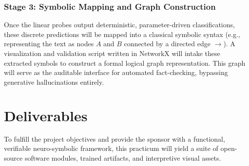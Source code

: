 \documentclass[12 pt]{article}  %
\begin{document}
\subsubsection{Stage 3: Symbolic Mapping and Graph Construction}
Once the linear probes output deterministic, parameter-driven classifications, these discrete predictions will be mapped into a classical symbolic syntax (e.g., representing the text as nodes $A$ and $B$ connected by a directed edge $\rightarrow$). A visualization and validation script written in NetworkX will intake these extracted symbols to construct a formal logical graph representation. This graph will serve as the auditable interface for automated fact-checking, bypassing generative hallucinations entirely.

\newpage
\section{Deliverables}
To fulfill the project objectives and provide the sponsor with a functional, verifiable neuro-symbolic framework, this practicum will yield a suite of open-source software modules, trained artifacts, and interpretive visual assets. 
\end{document}
